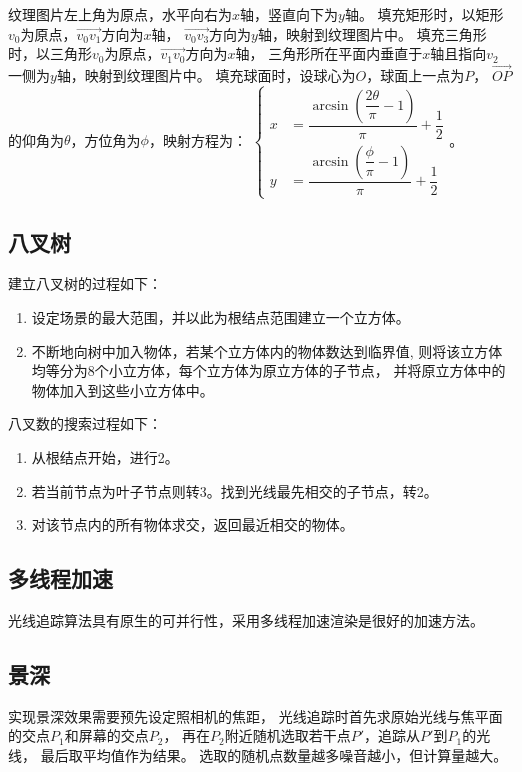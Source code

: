 纹理图片左上角为原点，水平向右为$x$轴，竖直向下为$y$轴。%
填充矩形时，以矩形$v_0$为原点，$\overrightarrow{v_0v_1}$方向为$x$轴，%
$\overrightarrow{v_0v_3}$方向为$y$轴，映射到纹理图片中。%
填充三角形时，以三角形$v_0$为原点，$\overrightarrow{v_1v_0}$方向为$x$轴，%
三角形所在平面内垂直于$x$轴且指向$v_2$一侧为$y$轴，映射到纹理图片中。%
填充球面时，设球心为$O$，球面上一点为$P$，%
$\overrightarrow{OP}$的仰角为$\theta$，方位角为$\phi$，映射方程为：%
$\left\{
\begin{aligned}
x & = \dfrac{\arcsin\left(\dfrac{2\theta}{\pi}-1\right)}{\pi}+\dfrac{1}{2} \\
y & = \dfrac{\arcsin\left(\dfrac{\phi}{\pi}-1\right)}{\pi}+\dfrac{1}{2}
\end{aligned}
\right.
$。
\subsection{八叉树}
建立八叉树的过程如下：
\begin{enumerate}
\item
设定场景的最大范围，并以此为根结点范围建立一个立方体。
\item
不断地向树中加入物体，若某个立方体内的物体数达到临界值,%
则将该立方体均等分为8个小立方体，每个立方体为原立方体的子节点，%
并将原立方体中的物体加入到这些小立方体中。
\end{enumerate}

八叉数的搜索过程如下：
\begin{enumerate}
\item
从根结点开始，进行2。
\item
若当前节点为叶子节点则转3。找到光线最先相交的子节点，转2。
\item
对该节点内的所有物体求交，返回最近相交的物体。
\end{enumerate}

\subsection{多线程加速}
光线追踪算法具有原生的可并行性，采用多线程加速渲染是很好的加速方法。%

\subsection{景深}
实现景深效果需要预先设定照相机的焦距，%
光线追踪时首先求原始光线与焦平面的交点$P_1$和屏幕的交点$P_2$，%
再在$P_2$附近随机选取若干点$P'$，追踪从$P'$到$P_1$的光线，%
最后取平均值作为结果。%
选取的随机点数量越多噪音越小，但计算量越大。

